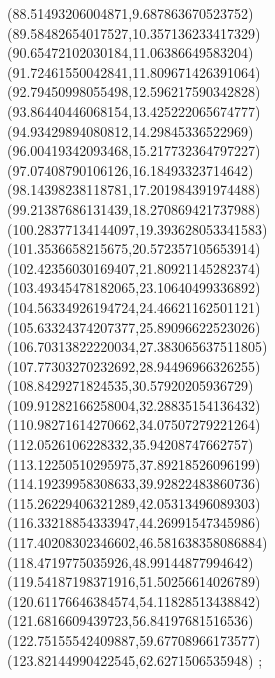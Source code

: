 {(88.51493206004871,9.687863670523752)
(89.58482654017527,10.357136233417329)
(90.65472102030184,11.06386649583204)
(91.72461550042841,11.809671426391064)
(92.79450998055498,12.596217590342828)
(93.86440446068154,13.425222065674777)
(94.93429894080812,14.29845336522969)
(96.00419342093468,15.217732364797227)
(97.07408790106126,16.18493323714642)
(98.14398238118781,17.201984391974488)
(99.21387686131439,18.270869421737988)
(100.28377134144097,19.393628053341583)
(101.3536658215675,20.572357105653914)
(102.42356030169407,21.80921145282374)
(103.49345478182065,23.10640499336892)
(104.56334926194724,24.46621162501121)
(105.63324374207377,25.89096622523026)
(106.70313822220034,27.383065637511805)
(107.77303270232692,28.94496966326255)
(108.8429271824535,30.57920205936729)
(109.91282166258004,32.28835154136432)
(110.98271614270662,34.07507279221264)
(112.0526106228332,35.94208747662757)
(113.12250510295975,37.89218526096199)
(114.19239958308633,39.92822483860736)
(115.26229406321289,42.05313496089303)
(116.33218854333947,44.26991547345986)
(117.40208302346602,46.581638358086884)
(118.4719775035926,48.99144877994642)
(119.54187198371916,51.50256614026789)
(120.61176646384574,54.11828513438842)
(121.6816609439723,56.84197681516536)
(122.75155542409887,59.67708966173577)
(123.82144990422545,62.6271506535948)
};

